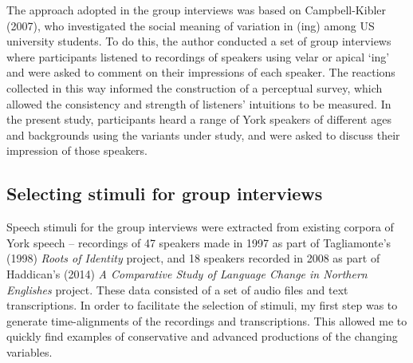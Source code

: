 \documentclass{article}
\begin{document}

The approach adopted in the group interviews was based on Campbell-Kibler (2007), who investigated the social meaning of variation in (ing) among US university students. To do this, the author conducted a set of group interviews where participants listened to recordings of speakers using velar or apical `ing' and were asked to comment on their impressions of each speaker. The reactions collected in this way informed the construction of a perceptual survey, which allowed the consistency and strength of listeners' intuitions to be measured. In the present study, participants heard a range of York speakers of different ages and backgrounds using the variants under study, and were asked to discuss their impression of those speakers. 

\newpage
\subsection*{Selecting stimuli for group interviews}

Speech stimuli for the group interviews were extracted from existing corpora of York speech -- recordings of 47 speakers made in 1997 as part of Tagliamonte's (1998) \textit{Roots of Identity} project, and 18 speakers recorded in 2008 as part of Haddican's (2014) \textit{A Comparative Study of Language Change in Northern Englishes} project. These data consisted of a set of audio files and text transcriptions. In order to facilitate the selection of stimuli, my first step was to generate time-alignments of the recordings and transcriptions. This allowed me to quickly find examples of conservative and advanced productions of the changing variables.
\end{document}

